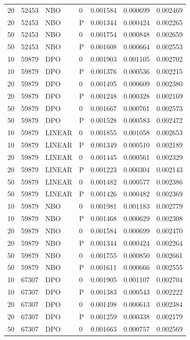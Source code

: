 \begin{longtable}{rrllrrr}
20 & 52453 & NBO & 0 & 0.001584 & 0.000699 & 0.002469\\
20 & 52453 & NBO & P & 0.001344 & 0.000424 & 0.002265\\
50 & 52453 & NBO & 0 & 0.001754 & 0.000848 & 0.002659\\
50 & 52453 & NBO & P & 0.001608 & 0.000664 & 0.002553\\
10 & 59879 & DPO & 0 & 0.001903 & 0.001105 & 0.002702\\
10 & 59879 & DPO & P & 0.001376 & 0.000536 & 0.002215\\
20 & 59879 & DPO & 0 & 0.001495 & 0.000609 & 0.002380\\
20 & 59879 & DPO & P & 0.001248 & 0.000328 & 0.002169\\
50 & 59879 & DPO & 0 & 0.001667 & 0.000761 & 0.002573\\
50 & 59879 & DPO & P & 0.001528 & 0.000583 & 0.002472\\
10 & 59879 & LINEAR & 0 & 0.001855 & 0.001058 & 0.002653\\
10 & 59879 & LINEAR & P & 0.001349 & 0.000510 & 0.002189\\
20 & 59879 & LINEAR & 0 & 0.001445 & 0.000561 & 0.002329\\
20 & 59879 & LINEAR & P & 0.001223 & 0.000304 & 0.002143\\
50 & 59879 & LINEAR & 0 & 0.001482 & 0.000577 & 0.002386\\
50 & 59879 & LINEAR & P & 0.001426 & 0.000482 & 0.002369\\
10 & 59879 & NBO & 0 & 0.001981 & 0.001183 & 0.002779\\
10 & 59879 & NBO & P & 0.001468 & 0.000629 & 0.002308\\
20 & 59879 & NBO & 0 & 0.001584 & 0.000699 & 0.002470\\
20 & 59879 & NBO & P & 0.001344 & 0.000424 & 0.002264\\
50 & 59879 & NBO & 0 & 0.001755 & 0.000850 & 0.002661\\
50 & 59879 & NBO & P & 0.001611 & 0.000666 & 0.002555\\
10 & 67307 & DPO & 0 & 0.001905 & 0.001107 & 0.002704\\
10 & 67307 & DPO & P & 0.001383 & 0.000543 & 0.002222\\
20 & 67307 & DPO & 0 & 0.001498 & 0.000613 & 0.002384\\
20 & 67307 & DPO & P & 0.001259 & 0.000338 & 0.002179\\
50 & 67307 & DPO & 0 & 0.001663 & 0.000757 & 0.002569\\

\end{longtable}
